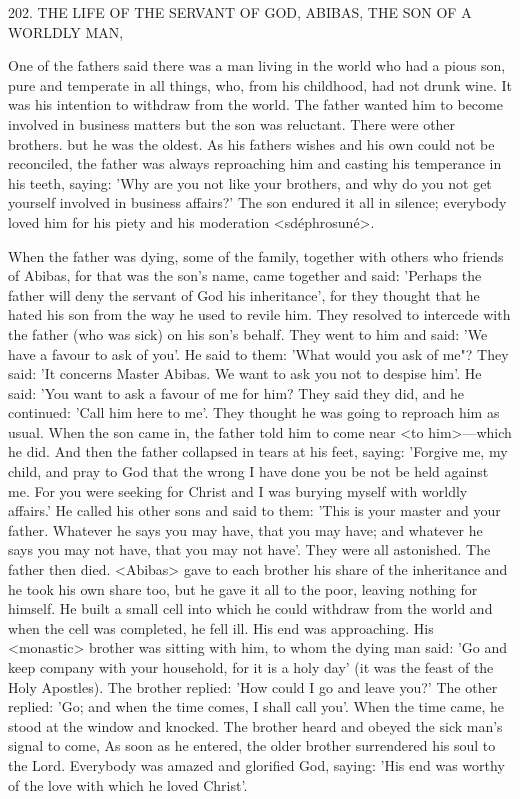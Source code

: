 202. THE LIFE OF THE SERVANT OF GOD,
ABIBAS, THE SON OF A WORLDLY MAN,

One of the fathers said there was a man living in the world who had
a pious son, pure and temperate in all things, who, from his
childhood, had not drunk wine. It was his intention to withdraw
from the world. The father wanted him to become involved in
business matters but the son was reluctant. There were other
brothers. but he was the oldest. As his father\textquotesingle s wishes and his own
could not be reconciled, the father was always reproaching him and
casting his temperance in his teeth, saying: 'Why are you not like
your brothers, and why do you not get yourself involved in business
affairs?' The son endured it all in silence; everybody loved him for
his piety and his moderation <sdéphrosuné>.

When the father was dying, some of the family, together with
others who friends of Abibas, for that was the son's name, came
together and said: 'Perhaps the father will deny the servant of God
his inheritance', for they thought that he hated his son from the way
he used to revile him. They resolved to intercede with the father
(who was sick) on his son's behalf. They went to him and said: 'We
have a favour to ask of you'. He said to them: 'What would you ask
of me"? They said: 'It concerns Master Abibas. We want to ask you
not to despise him'. He said: 'You want to ask a favour of me for
him? They said they did, and he continued: 'Call him here to me'.
They thought he was going to reproach him as usual. When the son
came in, the father told him to come near <to him>—which he did.
And then the father collapsed in tears at his feet, saying: 'Forgive
me, my child, and pray to God that the wrong I have done you be
not be held against me. For you were seeking for Christ and I was
burying myself with worldly affairs.' He called his other sons and
said to them: 'This is your master and your father. Whatever he
says you may have, that you may have; and whatever he says you
may not have, that you may not have'. They were all astonished.
The father then died. <Abibas> gave to each brother his share of
the inheritance and he took his own share too, but he gave it all to
the poor, leaving nothing for himself. He built a small cell into
which he could withdraw from the world and when the cell was
completed, he fell ill. His end was approaching. His <monastic>
brother was sitting with him, to whom the dying man said: 'Go and
keep company with your household, for it is a holy day' (it was the
feast of the Holy Apostles). The brother replied: 'How could I go
and leave you?' The other replied: 'Go; and when the time comes,
I shall call you'. When the time came, he stood at the window and
knocked. The brother heard and obeyed the sick man's signal to
come, As soon as he entered, the older brother surrendered his soul
to the Lord. Everybody was amazed and glorified God, saying: 'His
end was worthy of the love with which he loved Christ'.

